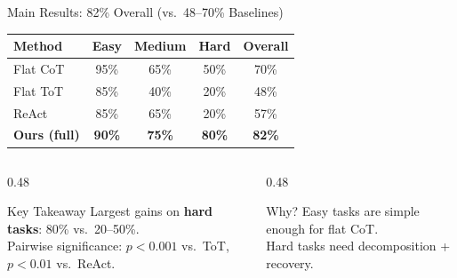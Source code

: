 \documentclass[aspectratio=169]{beamer}
\begin{document}
\begin{frame}{Main Results: 82\% Overall (vs.\ 48--70\% Baselines)}

\centering
\begin{tabular}{lcccc}
\toprule
\textbf{Method} & \textbf{Easy} & \textbf{Medium} & \textbf{Hard} & \textbf{Overall} \\
\midrule
Flat CoT & 95\% & 65\% & 50\% & 70\% \\
Flat ToT & 85\% & 40\% & 20\% & 48\% \\
ReAct & 85\% & 65\% & 20\% & 57\% \\
\textbf{Ours (full)} & \textbf{90\%} & \textbf{75\%} & \textbf{80\%} & \textbf{82\%} \\
\bottomrule
\end{tabular}

\vspace{0.5cm}
\begin{columns}[T]
\begin{column}{0.48\textwidth}
\begin{block}{Key Takeaway}
Largest gains on \textbf{hard tasks}: 80\% vs.\ 20--50\%. \\
Pairwise significance: $p < 0.001$ vs.\ ToT, $p < 0.01$ vs.\ ReAct.
\end{block}
\end{column}
\begin{column}{0.48\textwidth}
\begin{block}{Why?}
Easy tasks are simple enough for flat CoT. \\
Hard tasks need decomposition + recovery.
\end{block}
\end{column}
\end{columns}

\end{frame}
\end{document}
